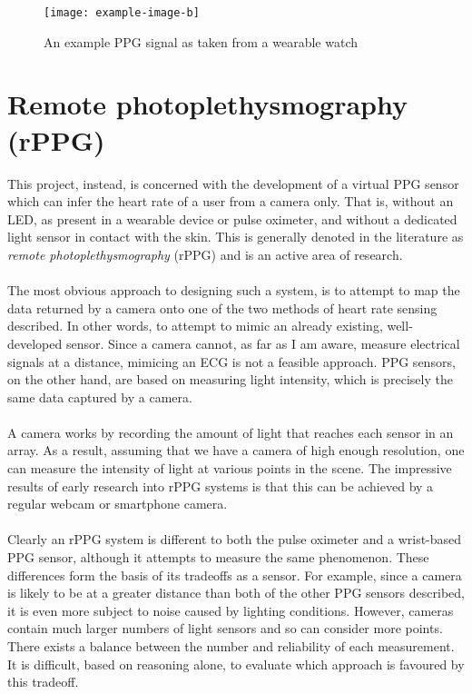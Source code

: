 \begin{figure}[H]
    \texttt{[image: example-image-b]}
   \caption{An example PPG signal as taken from a wearable watch} 
\end{figure}
\section{Remote photoplethysmography (rPPG)}
\label{ref:rPPG_prep}
This project, instead, is concerned with the development of a virtual PPG sensor which can infer the heart rate of a user from a camera only.
That is, without an LED, as present in a wearable device or pulse oximeter, and without a dedicated light sensor in contact with the skin. 
This is generally denoted in the literature as \textit{remote photoplethysmography} (rPPG) and is an active area of research.
\\\\
The most obvious approach to designing such a system, is to attempt to map the data returned by a camera onto one of the two methods of heart rate sensing described. In other words, to attempt 
to mimic an already existing, well-developed sensor.
Since a camera cannot, as far as I am aware, measure electrical signals at a distance, mimicing an ECG is not a feasible approach. PPG sensors, on the other hand, are based on measuring light intensity, which is precisely the same data captured by a camera.
\\\\
A camera works by recording the amount of light that reaches each sensor in an array. As a result, assuming that we have a camera of high enough resolution, one can measure the intensity of light 
at various points in the scene. The impressive results of early research into rPPG systems is that this can be achieved by a regular webcam or smartphone camera.
\\\\
Clearly an rPPG system is different to both the pulse oximeter and a wrist-based PPG sensor, although it attempts to measure the same phenomenon.
These differences form the basis of its tradeoffs as a sensor. For example, since a camera is likely to be at a greater distance than both of the other PPG sensors described, it is even more
subject to noise caused by lighting conditions. However, cameras contain much larger numbers of light sensors and so can consider more points. There exists a balance between the number and 
reliability of each measurement. It is difficult, based on reasoning alone, to evaluate which approach is favoured by this tradeoff. 

